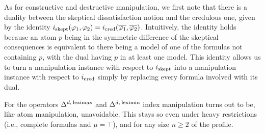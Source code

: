 As for constructive and destructive manipulation, we first note that
there is a duality between the skeptical dissatisfaction notion and 
the credulous one,
given by the identity 
$i_{{\operatorname{skept}}}(\varphi_1,\varphi_2)=i_{{\operatorname{cred}}}(\overline{\varphi_1},\overline{\varphi_2})$.
Intuitively, the identity holds because an atom $p$ being in the 
symmetric difference of the skeptical consequences is equivalent
to there being a model of one of the formulas not 
containing $p$, with the dual having $p$ in at least one model. 
This identity allows us to turn a manipulation instance with 
respect to $i_{{\operatorname{skept}}}$ into a manipulation instance with respect to $i_{{\operatorname{cred}}}$
simply by replacing every formula involved with its dual.

For the operators $\Delta^{d,\:{\operatorname{leximax}}}$ and $\Delta^{d,\:{\operatorname{leximin}}}$ 
index manipulation turns out to be, 
like atom manipulation,
unavoidable. 
This stays so even under heavy restrictions 
(i.e., complete formulas and $\mu=\top$), and for any size $n\geq 2$ of the profile.

